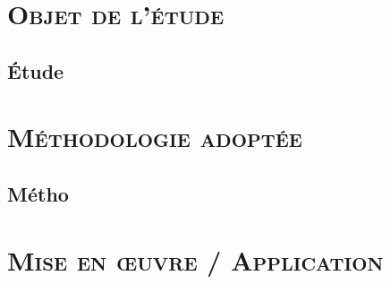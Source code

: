 \documentclass[xcolor=x11names, compress, 10pt]{beamer}
\begin{document}
\section{\scshape Objet de l’étude}



\subsection{Étude}
\begin{frame}[c]
    \vfill
    \vfill
\end{frame}




















\section{\scshape Méthodologie adoptée}



\subsection{Métho}
\begin{frame}[c]
    \vfill
    \vfill
\end{frame}

















\section{\scshape Mise en œuvre / Application}
\end{document}
